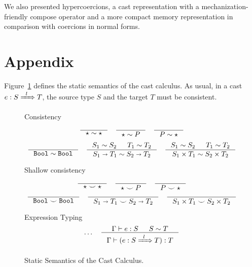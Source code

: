 \documentclass[runningheads]{llncs}
\newcommand{\infr}[2]{\inference{#1}{#2}}
\newcommand{\Tdyn}[0]{\ensuremath{\star}}
\newcommand{\Pbool}[0]{\ensuremath{\mathtt{Bool}}}
\newcommand{\Pfunc}[2]{\ensuremath{#1 \shortrightarrow #2}}
\newcommand{\Pprod}[2]{\ensuremath{#1 \times #2}}
\newcommand{\ecast}[2]{\ensuremath{#1 : #2}}
\newcommand{\ccast}[3]{#1 \xRightarrow[]{\enskip #2 \enskip} #3}
\newcommand{\consistent}[2]{\ensuremath{#1\sim#2}}
\newcommand{\shallowlyconsistent}[2]{\ensuremath{#1\smile#2}}
\newcommand{\expressiontyping}[3]{\ensuremath{#1 \vdash #2 : #3}}
\begin{document}
We also presented hypercoercions, a cast representation with a
mechanization-friendly compose operator and a more compact memory
representation in comparison with coercions in normal forms.

%
%
%
% 
% 
%
%

{}

\section{Appendix}

Figure~\ref{fig:statics2} defines the static semantics of the cast
calculus.
As usual, in a cast $\ecast{e}{\ccast{S}{l}{T}}$, the source type $S$
and the target $T$ must be consistent.


\begin{figure}[tp]
	\fbox{\consistent{T}{T}} Consistency
	\begin{gather*}
	\infr{}{\consistent{\Tdyn}{\Tdyn}} \quad
	\infr{}{\consistent{\Tdyn}{P}    } \quad
	\infr{}{\consistent{P}{\Tdyn}    }
	\\[1ex]
	\infr{}{
		\consistent{\Pbool}{\Pbool}
	} \quad
	\infr{
		\consistent{S_1}{S_2} &
		\consistent{T_1}{T_2}
	}{
		\consistent{\Pfunc{S_1}{T_1}}{\Pfunc{S_2}{T_2}}
	} \quad
	\infr{
		\consistent{S_1}{S_2} &
		\consistent{T_1}{T_2}
	}{
		\consistent{\Pprod{S_1}{T_1}}{\Pprod{S_2}{T_2}}
	}
	\end{gather*}
		
	\fbox{\shallowlyconsistent{T}{T}} Shallow consistency
	\begin{gather*}
	\inference{}{
		\shallowlyconsistent{\Tdyn}{\Tdyn}
	} \quad
	\inference{}{
		\shallowlyconsistent{\Tdyn}{P}
	} \quad
	\inference{}{
		\shallowlyconsistent{P}{\Tdyn}
	} \\
	\inference{}{
		\shallowlyconsistent{\Pbool}{\Pbool}
	} \quad
	\inference{}{
		\shallowlyconsistent{\Pfunc{S_1}{T_1}}{\Pfunc{S_2}{T_2}}
	} \quad
	\inference{}{
		\shallowlyconsistent{\Pprod{S_1}{T_1}}{\Pprod{S_2}{T_2}}
	}
	\end{gather*}


\fbox{$\expressiontyping{\Gamma}{e}{T}$} Expression Typing
\begin{gather*}
\dots \quad
\infr{
	\expressiontyping{\Gamma}{e}{S}  &
	\consistent{S}{T}
}{
	\expressiontyping{\Gamma}{(\ecast{e}{\ccast{S}{l}{T}})}{T}
}
\end{gather*}

\caption{Static Semantics of the Cast Calculus.}
\label{fig:statics2}
\end{figure}
\end{document}
